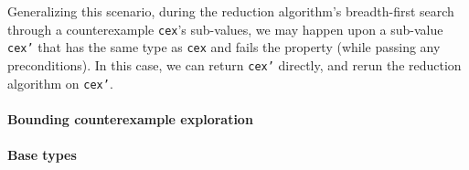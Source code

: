 \documentclass[10pt]{sigplanconf}
\newenvironment{code}{\begin{alltt}}{\end{alltt}}
\newcommand{\ttp}[1]{\texttt{#1}}
\begin{document}
Generalizing this scenario, during the reduction algorithm's breadth-first
search through a counterexample \ttp{cex}'s sub-values, we may happen upon a
sub-value \ttp{cex'} that has the same type as \ttp{cex} and fails the property
(while passing any preconditions).  In this case, we can return \ttp{cex'}
directly, and rerun the reduction algorithm on \ttp{cex'}.




\paragraph{Bounding counterexample exploration}


\paragraph{Base types}







\end{document}
